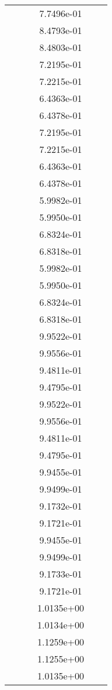 \begin{xltabular}{\textwidth}{r|rS[table-format=1.3e+2]S[table-format=1.4e+2]S[table-format=1.4e+2]S[table-format=-1.5]}
&  &  & 7.7496e-01 & & \\
&  &  & 8.4793e-01 & & \\
&  &  & 8.4803e-01 & & \\
&  &  & 7.2195e-01 & & \\
&  &  & 7.2215e-01 & & \\
&  &  & 6.4363e-01 & & \\
&  &  & 6.4378e-01 & & \\
&  &  & 7.2195e-01 & & \\
&  &  & 7.2215e-01 & & \\
&  &  & 6.4363e-01 & & \\
&  &  & 6.4378e-01 & & \\
&  &  & 5.9982e-01 & & \\
&  &  & 5.9950e-01 & & \\
&  &  & 6.8324e-01 & & \\
&  &  & 6.8318e-01 & & \\
&  &  & 5.9982e-01 & & \\
&  &  & 5.9950e-01 & & \\
&  &  & 6.8324e-01 & & \\
&  &  & 6.8318e-01 & & \\
&  &  & 9.9522e-01 & & \\
&  &  & 9.9556e-01 & & \\
&  &  & 9.4811e-01 & & \\
&  &  & 9.4795e-01 & & \\
&  &  & 9.9522e-01 & & \\
&  &  & 9.9556e-01 & & \\
&  &  & 9.4811e-01 & & \\
&  &  & 9.4795e-01 & & \\
&  &  & 9.9455e-01 & & \\
&  &  & 9.9499e-01 & & \\
&  &  & 9.1732e-01 & & \\
&  &  & 9.1721e-01 & & \\
&  &  & 9.9455e-01 & & \\
&  &  & 9.9499e-01 & & \\
&  &  & 9.1733e-01 & & \\
&  &  & 9.1721e-01 & & \\
&  &  & 1.0135e+00 & & \\
&  &  & 1.0134e+00 & & \\
&  &  & 1.1259e+00 & & \\
&  &  & 1.1255e+00 & & \\
&  &  & 1.0135e+00 & & \\

\end{xltabular}

